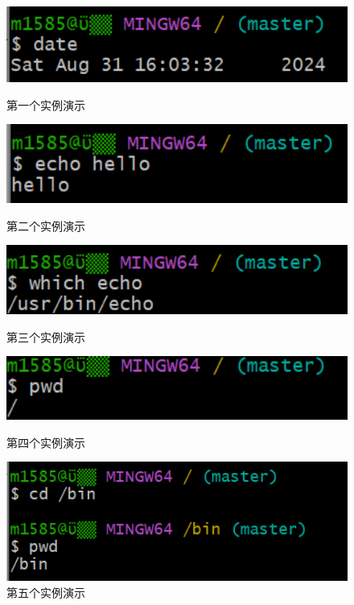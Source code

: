 \documentclass[a4paper, 12pt]{article}
\begin{document}
	\begin{figure}[h!]
		\centering
		\includegraphics[width=1\textwidth]{1}
		\caption{第一个实例演示}
		\includegraphics[width=1\textwidth]{2}
		\caption{第二个实例演示}
		\includegraphics[width=1\textwidth]{3}
		\caption{第三个实例演示}
		\includegraphics[width=1\textwidth]{4}
		\caption{第四个实例演示}
		\includegraphics[width=1\textwidth]{5}
		\caption{第五个实例演示}
	\end{figure}
\end{document}
